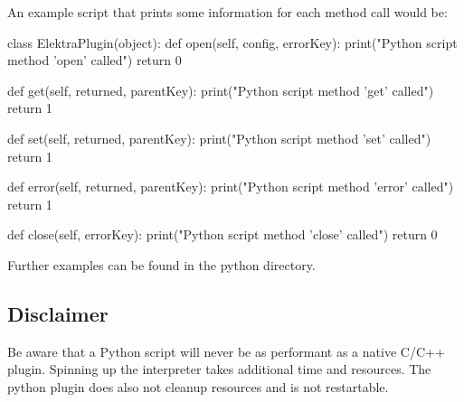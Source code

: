 An example script that prints some information for each method call would be\+: \begin{DoxyVerb}class ElektraPlugin(object):
    def open(self, config, errorKey):
        print("Python script method 'open' called")
        return 0

    def get(self, returned, parentKey):
        print("Python script method 'get' called")
        return 1

    def set(self, returned, parentKey):
        print("Python script method 'set' called")
        return 1

    def error(self, returned, parentKey):
        print("Python script method 'error' called")
        return 1

    def close(self, errorKey):
        print("Python script method 'close' called")
        return 0
\end{DoxyVerb}


Further examples can be found in the python directory.

\subsection*{Disclaimer}

Be aware that a Python script will never be as performant as a native C/\+C++ plugin. Spinning up the interpreter takes additional time and resources. The python plugin does also not cleanup resources and is not restartable. 